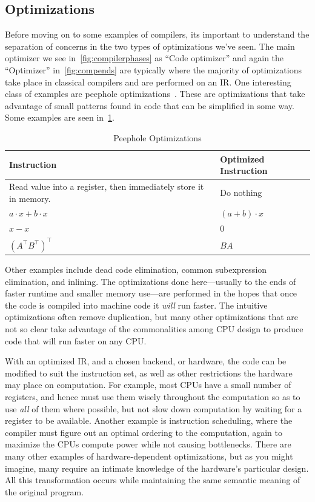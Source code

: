 \subsection{Optimizations}

Before moving on to some examples of compilers, its important to understand the separation of concerns in the two types of optimizations we've seen.
The main optimizer we see in~\cref{fig:compilerphases} as ``Code optimizer'' and again the ``Optimizer'' in~\cref{fig:compends} are typically where the majority of optimizations take place in classical compilers and are performed on an \ac{IR}.
One interesting class of examples are peephole optimizations~\cite{classical-peephole}.
These are optimizations that take advantage of small patterns found in code that can be simplified in some way.
Some examples are seen in~\cref{tab:peephole}.
\begin{table}[ht]
    \centering
    \begin{tabular}{p{}l}
        Instruction                                                      & Optimized Instruction \\ \toprule
        Read value into a register, then immediately store it in memory. & Do nothing            \\
        $a \cdot x + b \cdot x$                                          & $(a + b) \cdot x$     \\
        $x - x$                                                          & $0$                   \\
        $(A^\intercal B^\intercal)^\intercal$                            & $BA$
    \end{tabular}
    \caption{Peephole Optimizations}\label{tab:peephole}
\end{table}
Other examples include dead code elimination, common subexpression elimination, and inlining.
The optimizations done here---usually to the ends of faster runtime and smaller memory use---are performed in the hopes that once the code is compiled into machine code it \emph{will} run faster.
The intuitive optimizations often remove duplication, but many other optimizations that are not so clear take advantage of the commonalities among \ac{CPU} design to produce code that will run faster on any \ac{CPU}.

With an optimized \ac{IR}, and a chosen backend, or hardware, the code can be modified to suit the instruction set, as well as other restrictions the hardware may place on computation.
For example, most \acp{CPU} have a small number of registers, and hence must use them wisely throughout the computation so as to use \emph{all} of them where possible, but not slow down computation by waiting for a register to be available.
Another example is instruction scheduling, where the compiler must figure out an optimal ordering to the computation, again to maximize the \acp{CPU} compute power while not causing bottlenecks.
There are many other examples of hardware-dependent optimizations, but as you might imagine, many require an intimate knowledge of the hardware's particular design.
All this transformation occurs while maintaining the same semantic meaning of the original program.

